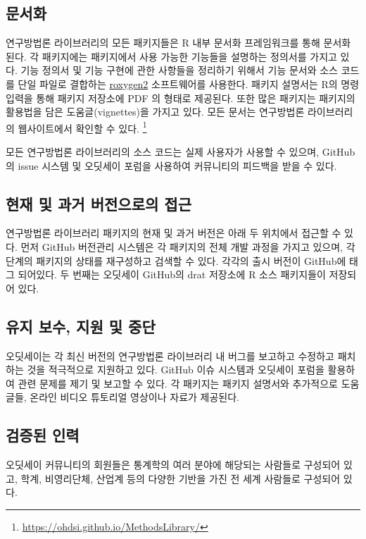 \documentclass[11pt]{book}
\let\rmarkdownfootnote\footnote%
\def\footnote{\protect\rmarkdownfootnote}
\theoremstyle{definition}
\theoremstyle{definition}
\theoremstyle{definition}
\theoremstyle{remark}
\begin{document}
\subsection{문서화}\label{-1}

연구방법론 라이브러리의 모든 패키지들은 R 내부 문서화 프레임워크를 통해
문서화 된다. 각 패키지에는 패키지에서 사용 가능한 기능들을 설명하는
정의서를 가지고 있다. 기능 정의서 및 기능 구현에 관한 사항들을 정리하기
위해서 기능 문서와 소스 코드를 단일 파일로 결합하는
\href{https://cran.r-project.org/web/packages/roxygen2/vignettes/roxygen2.html}{roxygen2}
소프트웨어를 사용한다. 패키지 설명서는 R의 명령 입력을 통해 패키지
저장소에 PDF 의 형태로 제공된다. 또한 많은 패키지는 패키지의 활용법을
담은 도움글(vignettes)을 가지고 있다. 모든 문서는 연구방법론
라이브러리의 웹사이트에서 확인할 수 있다. \footnote{\url{https://ohdsi.github.io/MethodsLibrary/}}

모든 연구방법론 라이브러리의 소스 코드는 실제 사용자가 사용할 수 있으며,
GitHub의 issue 시스템 및 오딧세이 포럼을 사용하여 커뮤니티의 피드백을
받을 수 있다.

\subsection{현재 및 과거 버전으로의 접근}\label{----}

연구방법론 라이브러리 패키지의 현재 및 과거 버전은 아래 두 위치에서
접근할 수 있다. 먼저 GitHub 버전관리 시스템은 각 패키지의 전체 개발
과정을 가지고 있으며, 각 단계의 패키지의 상태를 재구성하고 검색할 수
있다. 각각의 출시 버전이 GitHub에 태그 되어있다. 두 번째는 오딧세이
GitHub의 drat 저장소에 R 소스 패키지들이 저장되어 있다.

\subsection{유지 보수, 지원 및 중단}\label{----}

오딧세이는 각 최신 버전의 연구방법론 라이브러리 내 버그를 보고하고
수정하고 패치하는 것을 적극적으로 지원하고 있다. GitHub 이슈 시스템과
오딧세이 포럼을 활용하여 관련 문제를 제기 및 보고할 수 있다. 각 패키지는
패키지 설명서와 추가적으로 도움글들, 온라인 비디오 튜토리얼 영상이나
자료가 제공된다.

\subsection{검증된 인력}\label{-}

오딧세이 커뮤니티의 회원들은 통계학의 여러 분야에 해당되는 사람들로
구성되어 있고, 학계, 비영리단체, 산업계 등의 다양한 기반을 가진 전 세계
사람들로 구성되어 있다.
\end{document}
